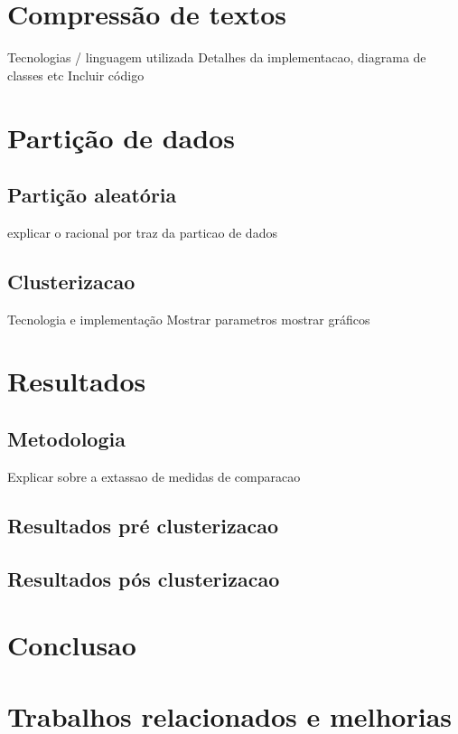 \section{Compressão de textos}
Tecnologias / linguagem utilizada
Detalhes da implementacao, diagrama de classes etc
Incluir código

\section{Partição de dados}
\subsection{Partição aleatória}
explicar o racional por traz da particao de dados
\subsection{Clusterizacao}
Tecnologia e implementação
Mostrar parametros
mostrar gráficos

\section{Resultados}
\subsection{Metodologia}
Explicar sobre a extassao de medidas de comparacao

\subsection{Resultados pré clusterizacao}

\subsection{Resultados pós clusterizacao}

\section{Conclusao}

\section{Trabalhos relacionados e melhorias}




